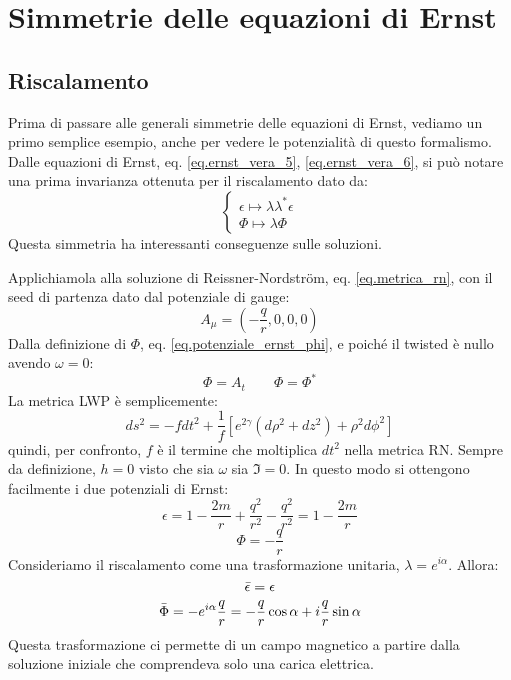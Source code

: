 \section{Simmetrie delle equazioni di Ernst}
\subsection{Riscalamento}
Prima di passare alle generali simmetrie delle equazioni di Ernst, vediamo un primo semplice esempio, anche per vedere le potenzialità di questo formalismo.
Dalle equazioni di Ernst, eq. \ref{eq.ernst_vera_5}, \ref{eq.ernst_vera_6}, si può notare una prima invarianza ottenuta per il riscalamento dato da:
\begin{equation*}
    \left\{\begin{array}{ccl}
         \epsilon \mapsto \lambda\lambda^* \epsilon \\
         \Phi \mapsto \lambda \Phi
    \end{array}\right.
\end{equation*}
Questa simmetria ha interessanti conseguenze sulle soluzioni.

Applichiamola alla soluzione di Reissner-Nordstr\"om, eq. \ref{eq.metrica_rn}, con il seed di partenza dato dal potenziale di gauge:
\begin{equation*}
    A_{\mu} = \left( -\frac{q}{r},0,0,0\right)
\end{equation*}
Dalla definizione di $\Phi$, eq. \ref{eq.potenziale_ernst_phi}, e poiché il twisted è nullo avendo $\omega = 0$:
\begin{equation*}
    \Phi = A_t \qquad \Phi= \Phi^*
\end{equation*}
La metrica LWP è semplicemente:
\begin{equation*}
    ds^2 = -fdt^2 + \frac{1}{f}\left[ e^{2\gamma}(d\rho^2 + dz^2) + \rho^2d\phi^2\right]
\end{equation*}
quindi, per confronto, $f$ è il termine che moltiplica $dt^2$ nella metrica RN. Sempre da definizione, $h=0$ visto che sia $\omega$ sia $\Im = 0$. In questo modo si ottengono facilmente i due potenziali di Ernst:
\begin{equation*}
    \epsilon = 1 - \frac{2m}{r} + \frac{q^2}{r^2} - \frac{q^2}{r^2} = 1 - \frac{2m}{r}
\end{equation*}
\begin{equation*}
    \Phi = - \frac{q}{r}
\end{equation*}
Consideriamo il riscalamento come una trasformazione unitaria, $\lambda = e^{i\alpha}$. Allora:
\begin{equation*}
    \Bar{\epsilon} = \epsilon
\end{equation*}
\begin{equation*}
    \Bar{\Phi} = - e^{i\alpha}\frac{q}{r} = - \frac{q}{r}\cos\alpha + i\frac{q}{r}\sin\alpha
\end{equation*}
Questa trasformazione ci permette di  un campo magnetico a partire dalla soluzione iniziale che comprendeva solo una carica elettrica. 

